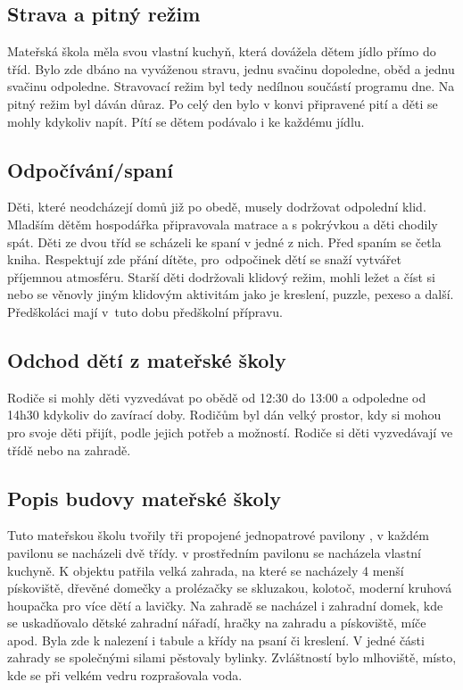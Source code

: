 		\subsection{Strava a pitný režim}
			Mateřská škola měla svou vlastní kuchyň, která dovážela dětem jídlo přímo do tříd. Bylo zde dbáno na vyváženou stravu, jednu svačinu dopoledne, oběd a jednu svačinu odpoledne. Stravovací režim byl tedy nedílnou součástí programu dne. Na pitný režim byl dáván důraz. Po celý den bylo v konvi připravené pití a děti se mohly kdykoliv napít. Pítí se dětem podávalo i ke každému jídlu.

		\subsection{Odpočívání/spaní}
			Děti, které neodcházejí domů již po obedě, musely dodržovat odpolední klid. Mladším dětěm hospodářka připravovala matrace a s pokrývkou a děti chodily spát. Děti ze dvou tříd se scházeli ke spaní v jedné z nich. Před spaním se četla kniha. Respektují zde přání dítěte, pro odpočinek dětí se snaží vytvářet příjemnou atmosféru. Starší děti dodržovali klidový režim, mohli ležet a číst si nebo se věnovly jiným klidovým aktivitám jako je kreslení, puzzle, pexeso a další.  Předškoláci mají v tuto dobu předškolní přípravu. 


		\subsection{Odchod dětí z mateřské školy}
			Rodiče si mohly děti vyzvedávat po obědě od 12:30 do 13:00 a odpoledne od 14h30 kdykoliv do zavírací doby. Rodičům byl dán velký prostor, kdy si mohou pro svoje děti přijít, podle jejich potřeb a možností. Rodiče si děti vyzvedávají ve třídě nebo na zahradě. 

		\subsection{Popis budovy mateřské školy}

			Tuto mateřskou školu tvořily tři propojené jednopatrové pavilony , v každém pavilonu se nacházeli dvě třídy. v prostředním pavilonu se nacházela vlastní kuchyně. K objektu patřila velká zahrada, na které se nacházely 4 menší pískoviště, dřevěné domečky a prolézačky se skluzakou, kolotoč, moderní kruhová houpačka pro více dětí a lavičky. Na zahradě se nacházel i zahradní domek, kde se uskadňovalo dětské zahradní nářadí, hračky na zahradu a pískoviště, míče apod. Byla zde k nalezení i tabule a křídy na psaní či kreslení. V jedné části zahrady se společnými silami pěstovaly bylinky. Zvláštností bylo mlhoviště, místo, kde se při velkém vedru rozprašovala voda. 

